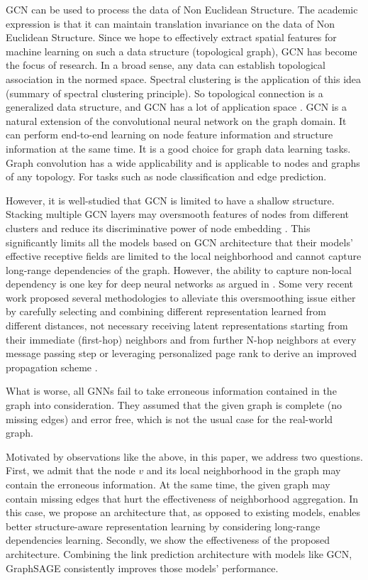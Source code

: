 GCN can be used to process the data of Non Euclidean Structure. The academic expression is that it can maintain translation invariance on the data of Non Euclidean Structure. Since we hope to effectively extract spatial features for machine learning on such a data structure (topological graph), GCN has become the focus of research. In a broad sense, any data can establish topological association in the normed space. Spectral clustering is the application of this idea (summary of spectral clustering principle). So topological connection is a generalized data structure, and GCN has a lot of application space \cite{qimaiinsight2018}. GCN is a natural extension of the convolutional neural network on the graph domain. It can perform end-to-end learning on node feature information and structure information at the same time. It is a good choice for graph data learning tasks. Graph convolution has a wide applicability and is applicable to nodes and graphs of any topology. For tasks such as node classification and edge prediction.

 However, it is well-studied that GCN is limited to have a shallow structure. Stacking multiple GCN layers may oversmooth features of nodes from different clusters and reduce its discriminative power of node embedding \cite{sun2019adagcn}. This significantly limits all the models based on GCN architecture that their models' effective receptive fields are limited to the local neighborhood and cannot capture long-range dependencies of the graph. However, the ability to capture non-local dependency is one key for deep neural networks as argued in \cite{wang2018non}. Some very recent work proposed several methodologies to alleviate this oversmoothing issue either by carefully selecting and combining different representation learned from different distances, not necessary receiving latent representations starting from their immediate (first-hop) neighbors and from further N-hop neighbors at every message passing step \cite{kapoor2019mixhop,xu2018representation} or leveraging personalized page rank to derive an improved propagation scheme \cite{klicpera2018predict}.
 
 What is worse, all GNNs fail to take erroneous information contained in the graph into consideration. They assumed that the given graph is complete (no missing edges) and error free, which is not the usual case for the real-world graph. 
 
 Motivated by observations like the above, in this paper, we address two questions. First, we 
 admit that the node $v$ and its local neighborhood in the graph may contain the erroneous information. At the same time, the given graph may contain missing edges that hurt the effectiveness of neighborhood aggregation. In this case, we propose an architecture that, as opposed to existing models, enables better structure-aware representation learning by considering long-range dependencies learning. Secondly, we show the effectiveness of the proposed architecture. Combining the link prediction architecture with models like GCN, GraphSAGE \cite{hamilton2017inductive} consistently improves those models' performance.
 
